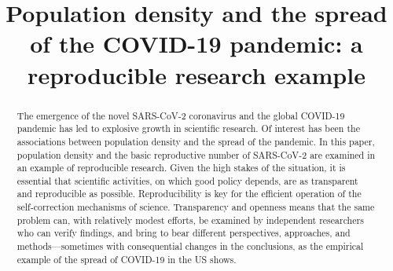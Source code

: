 \documentclass[]{elsarticle} %
\begin{document}
\begin{frontmatter}

  \title{Population density and the spread of the COVID-19 pandemic: a
reproducible research example}
      
  \begin{abstract}
  The emergence of the novel SARS-CoV-2 coronavirus and the global
  COVID-19 pandemic has led to explosive growth in scientific research.
  Of interest has been the associations between population density and
  the spread of the pandemic. In this paper, population density and the
  basic reproductive number of SARS-CoV-2 are examined in an example of
  reproducible research. Given the high stakes of the situation, it is
  essential that scientific activities, on which good policy depends,
  are as transparent and reproducible as possible. Reproducibility is
  key for the efficient operation of the self-correction mechanisms of
  science. Transparency and openness means that the same problem can,
  with relatively modest efforts, be examined by independent researchers
  who can verify findings, and bring to bear different perspectives,
  approaches, and methods---sometimes with consequential changes in the
  conclusions, as the empirical example of the spread of COVID-19 in the
  US shows.
  \end{abstract}
  
 \end{frontmatter}
\end{document}
